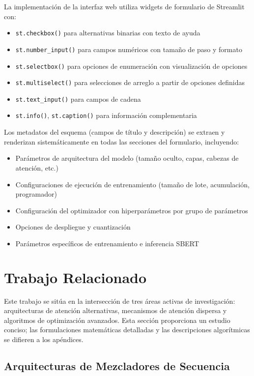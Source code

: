 \documentclass[11pt,a4paper]{article}
\begin{document}
La implementación de la interfaz web utiliza widgets de formulario de Streamlit con:
\begin{itemize}[leftmargin=*]
    \item \texttt{st.checkbox()} para alternativas binarias con texto de ayuda
    \item \texttt{st.number\_input()} para campos numéricos con tamaño de paso y formato
    \item \texttt{st.selectbox()} para opciones de enumeración con visualización de opciones
    \item \texttt{st.multiselect()} para selecciones de arreglo a partir de opciones definidas
    \item \texttt{st.text\_input()} para campos de cadena
    \item \texttt{st.info()}, \texttt{st.caption()} para información complementaria
\end{itemize}

Los metadatos del esquema (campos de título y descripción) se extraen y renderizan sistemáticamente en todas las secciones del formulario, incluyendo:
\begin{itemize}[leftmargin=*]
    \item Parámetros de arquitectura del modelo (tamaño oculto, capas, cabezas de atención, etc.)
    \item Configuraciones de ejecución de entrenamiento (tamaño de lote, acumulación, programador)
    \item Configuración del optimizador con hiperparámetros por grupo de parámetros
    \item Opciones de despliegue y cuantización
    \item Parámetros específicos de entrenamiento e inferencia SBERT
\end{itemize}

\section{Trabajo Relacionado}

Este trabajo se sitúa en la intersección de tres áreas activas de investigación: arquitecturas de atención alternativas, mecanismos de atención dispersa y algoritmos de optimización avanzados. Esta sección proporciona un estudio conciso; las formulaciones matemáticas detalladas y las descripciones algorítmicas se difieren a los apéndices.

\subsection{Arquitecturas de Mezcladores de Secuencia}
\end{document}
